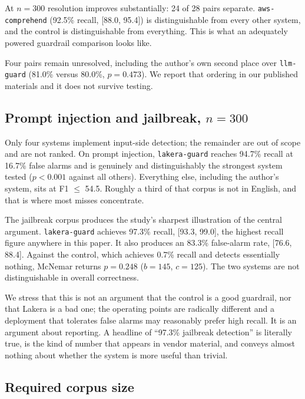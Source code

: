 \documentclass[11pt]{article}
\begin{document}
At $n = 300$ resolution improves substantially: 24 of 28 pairs separate.
\texttt{aws-comprehend} (92.5\% recall, [88.0, 95.4]) is distinguishable from
every other system, and the control is distinguishable from everything. This is
what an adequately powered guardrail comparison looks like.

Four pairs remain unresolved, including the author's own second place over
\texttt{llm-guard} (81.0\% versus 80.0\%, $p = 0.473$). We report that ordering
in our published materials and it does not survive testing.

\subsection{Prompt injection and jailbreak, \texorpdfstring{$n = 300$}{n = 300}}

Only four systems implement input-side detection; the remainder are out of scope
and are not ranked. On prompt injection, \texttt{lakera-guard} reaches 94.7\%
recall at 16.7\% false alarms and is genuinely and distinguishably the strongest
system tested ($p < 0.001$ against all others). Everything else, including the
author's system, sits at F1 $\leq$ 54.5. Roughly a third of that corpus is not in
English, and that is where most misses concentrate.

The jailbreak corpus produces the study's sharpest illustration of the central
argument. \texttt{lakera-guard} achieves 97.3\% recall, [93.3, 99.0], the highest
recall figure anywhere in this paper. It also produces an 83.3\% false-alarm rate,
[76.6, 88.4]. Against the control, which achieves 0.7\% recall and detects
essentially nothing, McNemar returns $p = 0.248$ ($b = 145$, $c = 125$). The two
systems are not distinguishable in overall correctness.

We stress that this is not an argument that the control is a good guardrail, nor
that Lakera is a bad one; the operating points are radically different and a
deployment that tolerates false alarms may reasonably prefer high recall. It is
an argument about reporting. A headline of ``97.3\% jailbreak detection'' is
literally true, is the kind of number that appears in vendor material, and
conveys almost nothing about whether the system is more useful than trivial.

\subsection{Required corpus size}
\end{document}
